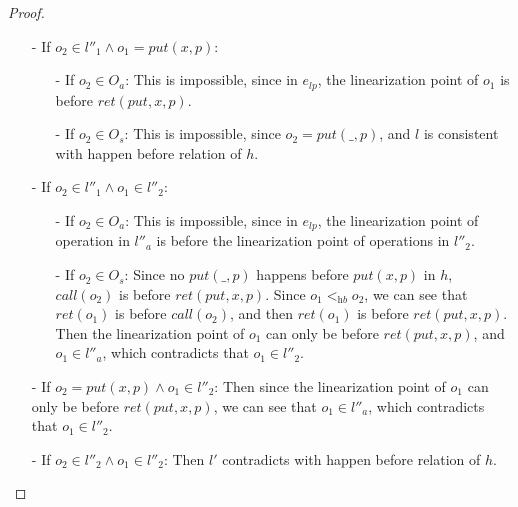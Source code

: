 \begin {proof}
\begin{itemize}
\begin{itemize}
    \item[-] If $o_2 \in O_a \wedge o_1 \in O_s$: It is not hard to see that $\textit{put}(x,p) <_{\textit{hb}} o_2$. Then, it is impossible to locate the linearization point of $o_2$ before $\textit{ret}(\textit{put},x,p)$ in $e_{\textit{lp}}$.
    \end{itemize}

\item[-] If $o_2 \in l''_1 \wedge o_1 = \textit{put}(x,p)$:
    \begin{itemize}
    \setlength{\itemsep}{0.5pt}
    \item[-] If $o_2 \in O_a$: This is impossible, since in $e_{\textit{lp}}$, the linearization point of $o_1$ is before $\textit{ret}(\textit{put},x,p)$.

    \item[-] If $o_2 \in O_s$: This is impossible, since $o_2 = \textit{put}(\_,p)$, and $l$ is consistent with happen before relation of $h$.
    \end{itemize}

\item[-] If $o_2 \in l''_1 \wedge o_1 \in l''_2$:
    \begin{itemize}
    \setlength{\itemsep}{0.5pt}
    \item[-] If $o_2 \in O_a$: This is impossible, since in $e_{\textit{lp}}$, the linearization point of operation in $l''_a$ is before the linearization point of operations in $l''_2$.

    \item[-] If $o_2 \in O_s$: Since no $\textit{put}(\_,p)$ happens before $\textit{put}(x,p)$ in $h$, $\textit{call}(o_2)$ is before $\textit{ret}(\textit{put},x,p)$. Since $o_1 <_{\textit{hb}} o_2$, we can see that $\textit{ret}(o_1)$ is before $\textit{call}(o_2)$, and then $\textit{ret}(o_1)$ is before $\textit{ret}(\textit{put},x,p)$. Then the linearization point of $o_1$ can only be before $\textit{ret}(\textit{put},x,p)$, and $o_1 \in l''_a$, which contradicts that $o_1 \in l''_2$.
    \end{itemize}

\item[-] If $o_2 = \textit{put}(x,p) \wedge o_1 \in l''_2$: Then since the linearization point of $o_1$ can only be before $\textit{ret}(\textit{put},x,p)$, we can see that $o_1 \in l''_a$, which contradicts that $o_1 \in l''_2$.

\item[-] If $o_2 \in l''_2 \wedge o_1 \in l''_2$: Then $l'$ contradicts with happen before relation of $h$.
\end{itemize}


\end{proof}
